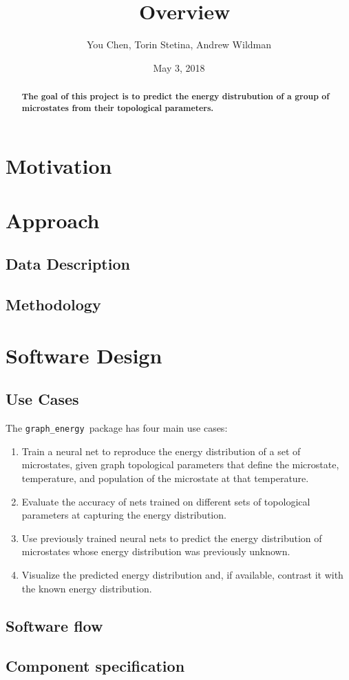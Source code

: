 \documentclass[paper=a4, fontsize=12pt]{article}
\title{
\softname\ Overview
}
\author{You Chen, Torin Stetina, Andrew Wildman}
\date{May 3, 2018}
\newcommand{\softname}{\texttt{graph\_energy}}
\begin{document}
\maketitle


\begin{abstract}
  \textbf{The goal of this project is to predict the energy distrubution of a group of microstates from their topological parameters.}
\end{abstract}

\section*{Motivation}

\section*{Approach}

\subsection*{Data Description}

\subsection*{Methodology}

\section*{Software Design}

\subsection*{Use Cases}

The \softname\ package has four main use cases:

\begin{enumerate}
  \item Train a neural net to reproduce the energy distribution of a set of microstates,
    given graph topological parameters that define the microstate, temperature, and population of the microstate at that temperature.
  \item Evaluate the accuracy of nets trained on different sets of topological parameters at capturing the energy distribution. 
  \item Use previously trained neural nets to predict the energy distribution of microstates whose energy distribution was previously unknown.
  \item Visualize the predicted energy distribution and, if available, contrast it with the known energy distribution.
\end{enumerate}

\subsection*{Software flow}




\subsection*{Component specification}
\end{document}
